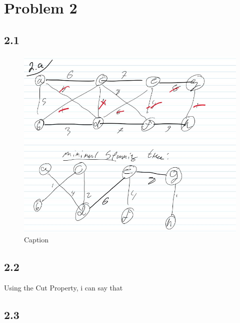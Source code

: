 \documentclass{article}
\begin{document}
\section*{Problem 2}


\subsection*{2.1}
\begin{figure}[h!]
    \centering
    \includegraphics[width=0.5\linewidth]{figures/problemset4_fig_2.jpg}
    \caption{Caption}
    \label{fig:enter-label}
\end{figure}




\subsection*{2.2}

Using the Cut Property, i can say that 


\subsection*{2.3}
\end{document}
